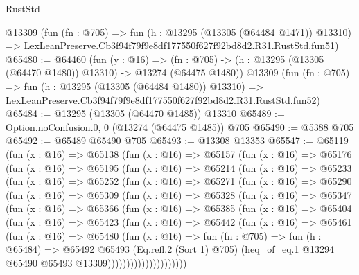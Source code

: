 \begin{lexlean}{RustStd}
\begin{coremodule}
    @13309
    (fun (fn : @705) =>
    fun (h : @13295 (@13305 (@64484 @1471)) @13310) =>
    LexLeanPreserve.Cb3f94f79f9e8df177550f627f92bd8d2.R31.RustStd.fun51)
@65480 := @64460
    (fun (y : @16) =>
    (fn : @705) -> (h : @13295 (@13305 (@64470 @1480)) @13310) -> @13274 (@64475 @1480))
    @13309
    (fun (fn : @705) =>
    fun (h : @13295 (@13305 (@64484 @1480)) @13310) =>
    LexLeanPreserve.Cb3f94f79f9e8df177550f627f92bd8d2.R31.RustStd.fun52)
@65484 := @13295 (@13305 (@64470 @1485)) @13310
@65489 := Option.noConfusion.{0, 0} (@13274 (@64475 @1485)) @705
@65490 := @5388 @705
@65492 := @65489 @65490 @705
@65493 := @13308 @13353
@65547 := @65119
    (fun (x : @16) =>
    @65138
      (fun (x : @16) =>
      @65157
        (fun (x : @16) =>
        @65176
          (fun (x : @16) =>
          @65195
            (fun (x : @16) =>
            @65214
              (fun (x : @16) =>
              @65233
                (fun (x : @16) =>
                @65252
                  (fun (x : @16) =>
                  @65271
                    (fun (x : @16) =>
                    @65290
                      (fun (x : @16) =>
                      @65309
                        (fun (x : @16) =>
                        @65328
                          (fun (x : @16) =>
                          @65347
                            (fun (x : @16) =>
                            @65366
                              (fun (x : @16) =>
                              @65385
                                (fun (x : @16) =>
                                @65404
                                  (fun (x : @16) =>
                                  @65423
                                    (fun (x : @16) =>
                                    @65442
                                      (fun (x : @16) =>
                                      @65461
                                        (fun (x : @16) =>
                                        @65480
                                          (fun (x : @16) =>
                                          fun (fn : @705) =>
                                          fun (h : @65484) =>
                                          @65492
                                            @65493
                                            (Eq.refl.{2} (Sort 1) @705)
                                            (heq_of_eq.{1}
                                              @13294
                                              @65490
                                              @65493
                                              @13309)))))))))))))))))))))

\end{coremodule}
\end{lexlean}
